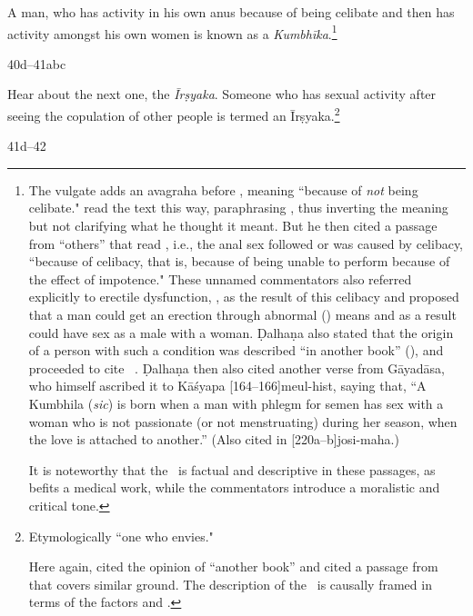\begin{translation}
A man, who has activity in his own anus because of being celibate and
then has activity amongst his own women is known as a
\emph{Kumbhīka}.\footnote{The vulgate adds an avagraha before
    , meaning “because of \emph{not} being celibate."
     read the text this way, paraphrasing
    , thus inverting the meaning but not clarifying
    what he thought it meant.  But he then cited a passage from “others”
    that read , i.e., the anal sex followed or was
    caused by celibacy,  “because of celibacy, that is,
    because of being unable to perform because of the effect of
    impotence."  These unnamed commentators also referred explicitly to
    erectile dysfunction, , as the result of
    this celibacy and proposed that a man could get an erection through
    abnormal () means and as a result could have sex as a
    male with a woman.  Ḍalhaṇa also stated that the origin of a person
    with such a condition was described “in another book”
    (), and proceeded to cite \CS\ .  
    Ḍalhaṇa then also cited another verse from Gāyadāsa, who himself 
    ascribed it to Kāśyapa [164--166]{meul-hist}, saying that, “A 
    Kumbhila (\emph{sic}) is born when a man with phlegm for semen 
    has sex with a woman who is not passionate (or not menstruating) during 
    her season, when the love is attached to another.” (Also cited in 
    [220a--b]{josi-maha}.)
    
    It is noteworthy that the \SS\ is factual and descriptive in
these passages, as befits a medical work, while the commentators
introduce a moralistic and critical tone.}

\item[40d--41abc]

Hear about the next one, the \emph{Īrṣyaka}.  
Someone who has sexual activity after seeing the copulation of other people 
is termed an Īrṣyaka.\footnote{Etymologically “one who envies."  
    
    Here again,  cited the opinion of “another 
    book” and cited a passage from \CS\  that covers similar 
    ground.  The description of the \CS\ is causally framed in terms of the 
    factors  and .} 

\item [41d--42]


\end{translation}
